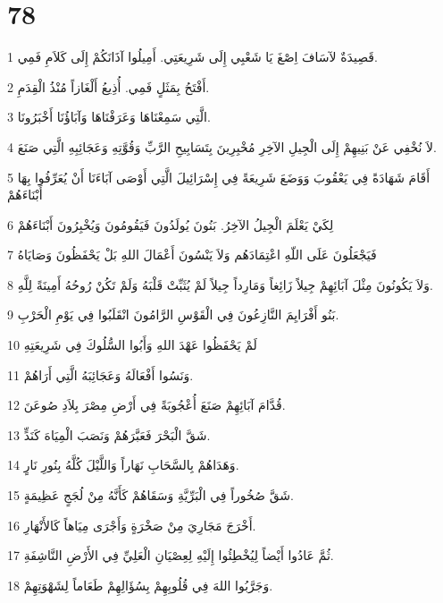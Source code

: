 \chapter{78}

\par 1 قَصِيدَةٌ لآسَافَ اِصْغَ يَا شَعْبِي إِلَى شَرِيعَتِي. أَمِيلُوا آذَانَكُمْ إِلَى كَلاَمِ فَمِي.
\par 2 أَفْتَحُ بِمَثَلٍ فَمِي. أُذِيعُ أَلْغَازاً مُنْذُ الْقِدَمِ.
\par 3 الَّتِي سَمِعْنَاهَا وَعَرَفْنَاهَا وَآبَاؤُنَا أَخْبَرُونَا.
\par 4 لاَ نُخْفِي عَنْ بَنِيهِمْ إِلَى الْجِيلِ الآخِرِ مُخْبِرِينَ بِتَسَابِيحِ الرَّبِّ وَقُوَّتِهِ وَعَجَائِبِهِ الَّتِي صَنَعَ.
\par 5 أَقَامَ شَهَادَةً فِي يَعْقُوبَ وَوَضَعَ شَرِيعَةً فِي إِسْرَائِيلَ الَّتِي أَوْصَى آبَاءَنَا أَنْ يُعَرِّفُوا بِهَا أَبْنَاءَهُمْ
\par 6 لِكَيْ يَعْلَمَ الْجِيلُ الآخِرُ. بَنُونَ يُولَدُونَ فَيَقُومُونَ وَيُخْبِرُونَ أَبْنَاءَهُمْ
\par 7 فَيَجْعَلُونَ عَلَى اللّهِ اعْتِمَادَهُم وَلاَ يَنْسُونَ أَعْمَالَ اللهِ بَلْ يَحْفَظُونَ وَصَايَاهُ
\par 8 وَلاَ يَكُونُونَ مِثْلَ آبَائِهِمْ جِيلاً زَائِغاً وَمَارِداً جِيلاً لَمْ يُثَبِّتْ قَلْبَهُ وَلَمْ تَكُنْ رُوحُهُ أَمِينَةً لِلَّهِ.
\par 9 بَنُو أَفْرَايِمَ النَّازِعُونَ فِي الْقَوْسِ الرَّامُونَ انْقَلَبُوا فِي يَوْمِ الْحَرْبِ.
\par 10 لَمْ يَحْفَظُوا عَهْدَ اللهِ وَأَبُوا السُّلُوكَ فِي شَرِيعَتِهِ
\par 11 وَنَسُوا أَفْعَالَهُ وَعَجَائِبَهُ الَّتِي أَرَاهُمْ.
\par 12 قُدَّامَ آبَائِهِمْ صَنَعَ أُعْجُوبَةً فِي أَرْضِ مِصْرَ بِلاَدِ صُوعَنَ.
\par 13 شَقَّ الْبَحْرَ فَعَبَّرَهُمْ وَنَصَبَ الْمِيَاهَ كَنَدٍّ.
\par 14 وَهَدَاهُمْ بِالسَّحَابِ نَهَاراً وَاللَّيْلَ كُلَّهُ بِنُورِ نَارٍ.
\par 15 شَقَّ صُخُوراً فِي الْبَرِّيَّةِ وَسَقَاهُمْ كَأَنَّهُ مِنْ لُجَجٍ عَظِيمَةٍ.
\par 16 أَخْرَجَ مَجَارِيَ مِنْ صَخْرَةٍ وَأَجْرَى مِيَاهاً كَالأَنْهَارِ.
\par 17 ثُمَّ عَادُوا أَيْضاً لِيُخْطِئُوا إِلَيْهِ لِعِصْيَانِ الْعَلِيِّ فِي الأَرْضِ النَّاشِفَةِ.
\par 18 وَجَرَّبُوا اللهَ فِي قُلُوبِهِمْ بِسُؤَالِهِمْ طَعَاماً لِشَهْوَتِهِمْ.
